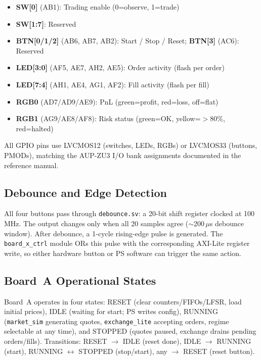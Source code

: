 \documentclass[conference]{IEEEtran}
\begin{document}
\begin{itemize}[noitemsep]
  \item \textbf{SW[0]} (AB1): Trading enable (0=observe, 1=trade)
  \item \textbf{SW[1:7]}: Reserved
  \item \textbf{BTN[0/1/2]} (AB6, AB7, AB2): Start / Stop / Reset; \textbf{BTN[3]} (AC6): Reserved
  \item \textbf{LED[3:0]} (AF5, AE7, AH2, AE5): Order activity (flash per order)
  \item \textbf{LED[7:4]} (AH1, AE4, AG1, AF2): Fill activity (flash per fill)
  \item \textbf{RGB0} (AD7/AD9/AE9): PnL (green=profit, red=loss, off=flat)
  \item \textbf{RGB1} (AG9/AE8/AF8): Risk status (green=OK, yellow=$>$80\%, red=halted)
\end{itemize}

All GPIO pins use LVCMOS12 (switches, LEDs, RGBs) or LVCMOS33 (buttons, PMODs), matching the AUP-ZU3 I/O bank assignments documented in the reference manual.

\subsection{Debounce and Edge Detection}

All four buttons pass through \texttt{debounce.sv}: a 20-bit shift register clocked at 100\,MHz. The output changes only when all 20 samples agree ($\sim$200\,$\mu$s debounce window). After debounce, a 1-cycle rising-edge pulse is generated. The \texttt{board\_x\_ctrl} module ORs this pulse with the corresponding AXI-Lite register write, so either hardware button or PS software can trigger the same action.

\subsection{Board~A Operational States}

Board~A operates in four states: RESET (clear counters/FIFOs/LFSR, load initial prices), IDLE (waiting for start; PS writes config), RUNNING (\texttt{market\_sim} generating quotes, \texttt{exchange\_lite} accepting orders, regime selectable at any time), and STOPPED (quotes paused, exchange drains pending orders/fills). Transitions: RESET $\rightarrow$ IDLE (reset done), IDLE $\rightarrow$ RUNNING (start), RUNNING $\leftrightarrow$ STOPPED (stop/start), any $\rightarrow$ RESET (reset button).
\end{document}
